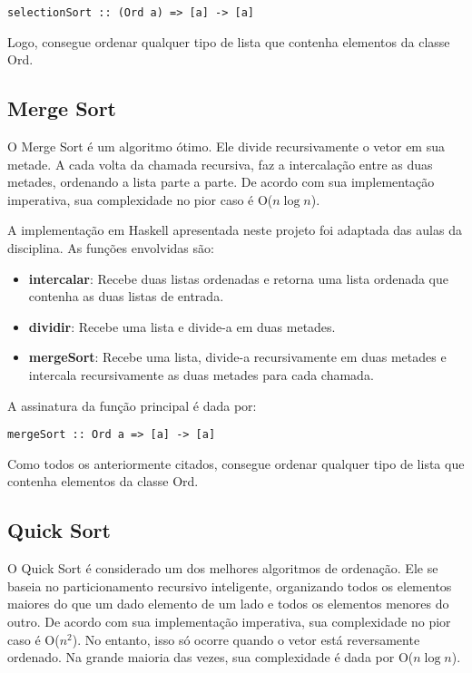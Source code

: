 \documentclass[12pt,a4paper]{article}
\begin{document}
\begin{lstlisting}
selectionSort :: (Ord a) => [a] -> [a]
\end{lstlisting}

Logo, consegue ordenar qualquer tipo de lista que contenha elementos da classe Ord.


\subsection{Merge Sort}
O Merge Sort é um algoritmo ótimo. Ele divide recursivamente o vetor em sua metade. A cada volta da chamada recursiva, faz a intercalação entre as duas metades, ordenando a lista parte a parte. De acordo com sua implementação imperativa, sua complexidade no pior caso é O($n\log n$). 

A implementação em Haskell apresentada neste projeto foi adaptada das aulas da disciplina. As funções envolvidas são:

\begin{itemize}
\item \textbf{intercalar}: Recebe duas listas ordenadas e retorna uma lista ordenada que contenha as duas listas de entrada.
\item \textbf{dividir}: Recebe uma lista e divide-a em duas metades.
\item \textbf{mergeSort}: Recebe uma lista, divide-a recursivamente em duas metades e intercala recursivamente as duas metades para cada chamada.
\end{itemize}

A assinatura da função principal é dada por:

\begin{lstlisting}
mergeSort :: Ord a => [a] -> [a]
\end{lstlisting}

Como todos os anteriormente citados, consegue ordenar qualquer tipo de lista que contenha elementos da classe Ord.

\subsection{Quick Sort}
O Quick Sort é considerado um dos melhores algoritmos de ordenação. Ele se baseia no particionamento recursivo inteligente, organizando todos os elementos maiores do que um dado elemento de um lado e todos os elementos menores do outro. De acordo com sua implementação imperativa, sua complexidade no pior caso é O($n^2$). No entanto, isso só ocorre quando o vetor está reversamente ordenado. Na grande maioria das vezes, sua complexidade é dada por O($n\log n$). 
\end{document}
